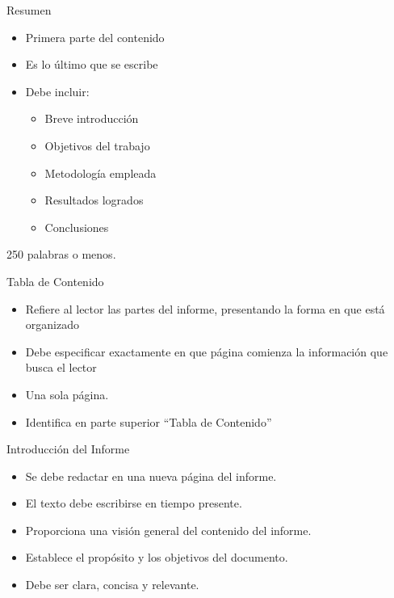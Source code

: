 \documentclass[
11pt, %
]{beamer}
\begin{document}
\begin{frame}{Resumen}
	\begin{itemize}
		\item Primera parte del contenido
		\item Es lo último que se escribe
		\item Debe incluir:
		      \begin{itemize}
			      \item Breve introducción
			      \item Objetivos del trabajo
			      \item Metodología empleada
			      \item Resultados logrados
			      \item Conclusiones
		      \end{itemize}
	\end{itemize}
	250 palabras o menos.
\end{frame}

\begin{frame}{Tabla de Contenido}
	\begin{itemize}
		\item Refiere al lector las partes del informe, presentando la forma en que está organizado
		\item Debe especificar exactamente en que página comienza la información que busca el lector
		\item Una sola página.
		\item Identifica en parte superior “Tabla de Contenido”
	\end{itemize}
\end{frame}

\begin{frame}{Introducción del Informe}
	\begin{itemize}
		\item Se debe redactar en una nueva página del informe.
		\item El texto debe escribirse en tiempo presente.
		\item Proporciona una visión general del contenido del informe.
		\item Establece el propósito y los objetivos del documento.
		\item Debe ser clara, concisa y relevante.
	\end{itemize}
\end{frame}
\end{document}
